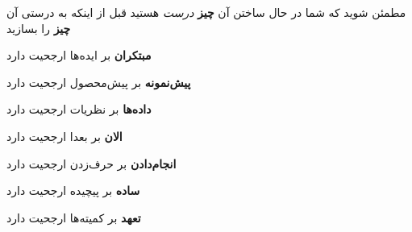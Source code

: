 مطمئن شوید که شما در حال ساختن آن \textbf{چیز} \emph{درست} هستید قبل از
اینکه به درستی آن \textbf{چیز} را بسازید

\textbf{مبتکران} بر ایده‌ها ارجحیت دارد

\textbf{پیش‌نمونه} بر پیش‌محصول ارجحیت دارد

\textbf{داد‌‌ه‌ها} بر نظریات ارجحیت دارد

\textbf{الان} بر بعدا ارجحیت دارد

\textbf{انجام‌دادن} بر حرف‌زدن ارجحیت دارد

\textbf{ساده} بر پیچیده ارجحیت دارد

\textbf{تعهد} بر کمیته‌ها ارجحیت دارد
